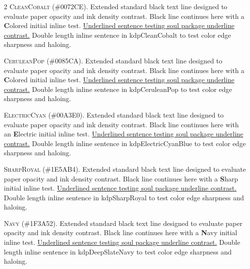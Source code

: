 \begin{multicols}{2}
\lettrine[lines=2]{\textcolor{kdpCleanCobalt}{C}}{leanCobalt} (\#0072CE). Extended standard black text line designed to evaluate paper opacity and ink density contrast. Black line continues here with a \textbf{\textcolor{kdpCleanCobalt}{C}}olored initial inline test. \ul{Underlined sentence testing soul package underline contrast.} \textcolor{kdpCleanCobalt}{Double length inline sentence in kdpCleanCobalt to test color edge sharpness and haloing.}


\lettrine[lines=2]{\textcolor{kdpCeruleanPop}{C}}{eruleanPop} (\#0085CA). Extended standard black text line designed to evaluate paper opacity and ink density contrast. Black line continues here with a \textbf{\textcolor{kdpCeruleanPop}{C}}olored initial inline test. \ul{Underlined sentence testing soul package underline contrast.} \textcolor{kdpCeruleanPop}{Double length inline sentence in kdpCeruleanPop to test color edge sharpness and haloing.}


\lettrine[lines=2]{\textcolor{kdpElectricCyanBlue}{E}}{lectricCyan} (\#00A3E0). Extended standard black text line designed to evaluate paper opacity and ink density contrast. Black line continues here with an \textbf{\textcolor{kdpElectricCyanBlue}{E}}lectric initial inline test. \ul{Underlined sentence testing soul package underline contrast.} \textcolor{kdpElectricCyanBlue}{Double length inline sentence in kdpElectricCyanBlue to test color edge sharpness and haloing.}


\lettrine[lines=2]{\textcolor{kdpSharpRoyal}{S}}{harpRoyal} (\#1E5AB4). Extended standard black text line designed to evaluate paper opacity and ink density contrast. Black line continues here with a \textbf{\textcolor{kdpSharpRoyal}{S}}harp initial inline test. \ul{Underlined sentence testing soul package underline contrast.} \textcolor{kdpSharpRoyal}{Double length inline sentence in kdpSharpRoyal to test color edge sharpness and haloing.}


\lettrine[lines=2]{\textcolor{kdpDeepSlateNavy}{N}}{avy} (\#1F3A52). Extended standard black text line designed to evaluate paper opacity and ink density contrast. Black line continues here with a \textbf{\textcolor{kdpDeepSlateNavy}{N}}avy initial inline test. \ul{Underlined sentence testing soul package underline contrast.} \textcolor{kdpDeepSlateNavy}{Double length inline sentence in kdpDeepSlateNavy to test color edge sharpness and haloing.}



\end{multicols}
